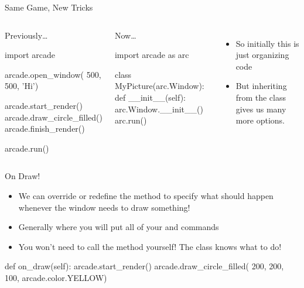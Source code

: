 \documentclass[pdf, aspectratio=169, 12pt]{beamer}
\begin{document}
\begin{frame}[fragile]{Same Game, New Tricks}
	\begin{columns}[t]
		\begin{block}{Previously\ldots}
			\footnotesize
			\begin{pythoncode}
				import arcade

				arcade.open_window(
								500,
								500,
								'Hi')

				arcade.start_render()
				arcade.draw_circle_filled()
				arcade.finish_render()

				arcade.run()

			\end{pythoncode}
		\end{block}
		\begin{block}{Now\ldots}
			\footnotesize
			\begin{pythoncode}
				import arcade as arc

				class MyPicture(arc.Window):
					def __init__(self):
						arc.Window.__init__()
						arc.run()
			\end{pythoncode}
		\end{block}

		\pause
		\begin{itemize}
			\item So initially this is just organizing code
			\item But inheriting from the  class gives us \alert{many} more options.
		\end{itemize}
	\end{columns}
\end{frame}

\begin{frame}[fragile]{On Draw!}
	\begin{itemize}
		\item We can override or redefine the  method to specify what should happen whenever the window needs to draw something!
		\item Generally where you will put all of your  and  commands
		\item You won't need to call the method yourself! The class knows what to do!
	\end{itemize}
	\begin{pythoncode}
		def on_draw(self):
			arcade.start_render()
			arcade.draw_circle_filled(
									200,
									200,
									100,
									arcade.color.YELLOW)
	\end{pythoncode}
	
\end{frame}
\end{document}
